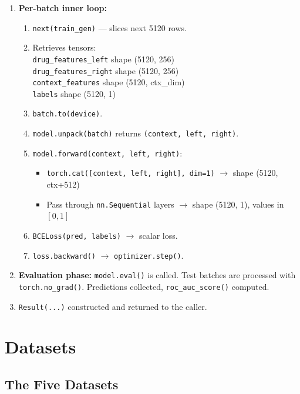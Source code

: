 \documentclass[12pt,a4paper,oneside]{book}
\begin{document}
\begin{enumerate}
  \item \textbf{Per-batch inner loop:}
  \begin{enumerate}
    \item \texttt{next(train\_gen)} --- slices next 5120 rows.
    \item Retrieves tensors:\\
      \texttt{drug\_features\_left} shape (5120, 256)\\
      \texttt{drug\_features\_right} shape (5120, 256)\\
      \texttt{context\_features} shape (5120, ctx\_dim)\\
      \texttt{labels} shape (5120, 1)
    \item \texttt{batch.to(device)}.
    \item \texttt{model.unpack(batch)} returns \texttt{(context, left, right)}.
    \item \texttt{model.forward(context, left, right)}:
    \begin{itemize}
      \item \texttt{torch.cat([context, left, right], dim=1)} $\to$ shape (5120, ctx+512)
      \item Pass through \texttt{nn.Sequential} layers $\to$ shape (5120, 1), values in $[0,1]$
    \end{itemize}
    \item \texttt{BCELoss(pred, labels)} $\to$ scalar loss.
    \item \texttt{loss.backward()} $\to$ \texttt{optimizer.step()}.
  \end{enumerate}

  \item \textbf{Evaluation phase:} \texttt{model.eval()} is called. Test batches are processed
  with \texttt{torch.no\_grad()}. Predictions collected, \texttt{roc\_auc\_score()} computed.

  \item \texttt{Result(...)} constructed and returned to the caller.
\end{enumerate}
\chapter{Datasets}\label{chap:datasets}

\section{The Five Datasets}
\end{document}
